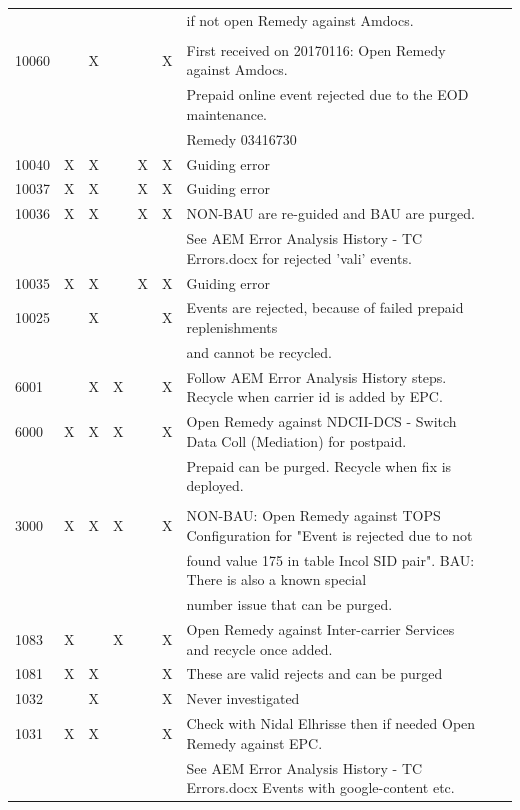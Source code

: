 \documentclass[12pt,twoside]{article}
\begin{document}
\begin{landscape}
\begin{longtable}{l|l|l|l|l|l|l|l|l}
&  &  &  &  &  & if not open Remedy against Amdocs.\\
&  &  &  &  &  & \\
10060 &  & X &  &  & X & First received on 20170116:  Open Remedy against Amdocs.\\
&  &  &  &  &  & Prepaid online event rejected due to the EOD maintenance.\\
&  &  &  &  &  & Remedy 03416730\\
10040 & X & X &  & X & X & Guiding error\\
10037 & X & X &  & X & X & Guiding error\\
10036 & X & X &  & X & X & NON-BAU are re-guided and BAU are purged.\\
&  &  &  &  &  & See AEM Error Analysis History - TC Errors.docx  for rejected 'vali' events.\\
10035 & X & X &  & X & X & Guiding error\\
10025 &  & X &  &  & X & Events are rejected, because of failed prepaid replenishments\\
&  &  &  &  &  & and cannot be recycled.\\
6001 &  & X & X &  & X & Follow AEM Error Analysis History steps.  Recycle when carrier id is added by EPC.\\
6000 & X & X & X &  & X & Open Remedy against NDCII-DCS - Switch Data Coll (Mediation) for postpaid.\\
&  &  &  &  &  & Prepaid can be purged.  Recycle when fix is deployed.\\
&  &  &  &  &  & \\
3000 & X & X & X &  & X & NON-BAU: Open Remedy against TOPS Configuration for "Event is rejected due to not\\
&  &  &  &  &  & found value 175 in table Incol SID pair".  BAU:  There is also a known special\\
&  &  &  &  &  & number issue that can be purged.\\
1083 & X &  & X &  & X & Open Remedy against Inter-carrier Services and recycle once added.\\
1081 & X & X &  &  & X & These are valid rejects and can be purged\\
1032 &  & X &  &  & X & Never investigated\\
1031 & X & X &  &  & X & Check with Nidal Elhrisse then if needed Open Remedy against EPC.\\
&  &  &  &  &  & See AEM Error Analysis History - TC Errors.docx  Events with google-content etc.\\

\end{longtable}
\end{landscape}
\end{document}

